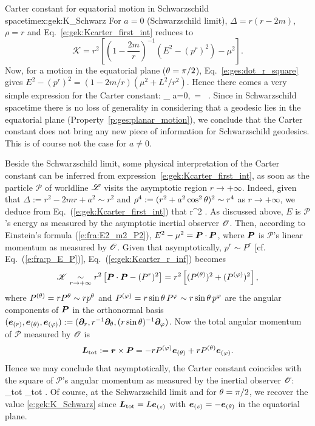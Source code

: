 \begin{texample}{Carter constant for equatorial motion in Schwarzschild spacetime}{x:gek:K_Schwarz}
For $a=0$ (Schwarzschild limit), $\Delta = r(r - 2m)$, $\rho = r$
and Eq.~\eqref{e:gek:Kcarter_first_int} reduces to
\[
    \mathscr{K} = r^2 \left[ \left( 1 - \frac{2m}{r} \right) ^{-1} \left( E^2 -  (p^r)^2 \right)
        - \mu^2 \right] .
\]
Now, for a motion in the equatorial plane ($\theta=\pi/2$), Eq.~\eqref{e:ges:dot_r_square} gives
$E^2 -  (p^r)^2 =  ( 1 - {2m}/{r} ) \left( \mu^2 + {L^2}/{r^2} \right)$.
Hence there comes a very simple expression for the Carter constant:
\be \label{e:gek:K_Schwarz}
    _{\; a=0,\, \th=} \ .
\ee
Since in Schwarzschild spacetime there is no loss of generality in considering that
a geodesic lies in the equatorial plane (Property~\ref{p:ges:planar_motion}), we conclude
that the Carter constant does not bring any new piece of information for
Schwarzschild geodesics. This is of course not the case for $a\neq 0$.
\end{texample}

Beside the Schwarzschild limit, some physical interpretation of the Carter constant
can be inferred from
expression~\eqref{e:gek:Kcarter_first_int}, as soon as the particle $\mathscr{P}$ of worldline $\mathscr{L}$ visits the asymptotic region $r\to+\infty$. Indeed, given
that $\Delta := r^2 - 2m r + a^2 \sim r^2$  and $\rho^4 := (r^2 + a^2\cos^2\theta)^2 \sim r^4$
as $r\to+\infty$, we deduce from Eq.~(\ref{e:gek:Kcarter_first_int})
that
\be \label{e:gek:Kcarter_r_inf}
      r^2 \left[ E^2 - \mu^2 - (p^r)^2 \right] .
\ee
As discussed above, $E$ is $\mathscr{P}$'s energy as measured by
the asymptotic inertial observer $\mathscr{O}$. Then, according to
Einstein's formula (\ref{e:fra:E2_m2_P2}), $E^2 - \mu^2 = \bm{P}\cdot\bm{P}$, where
$\bm{P}$ is $\mathscr{P}$'s linear momentum as measured by $\mathscr{O}$. Given
that asymptotically, $p^r\sim P^r$ [cf. Eq.~(\ref{e:fra:p_E_P})],
Eq.~(\ref{e:gek:Kcarter_r_inf}) becomes
\[
    \mathscr{K} \underset{r\to + \infty}{\sim} r^2 \left[ \bm{P}\cdot\bm{P} - (P^r)^2 \right]
    = r^2 \left[ (P^{(\theta)})^2 + (P^{(\varphi)})^2 \right],
\]
where $P^{(\theta)} = r P^\theta \sim r p^\theta$ and $P^{(\varphi)} = r\sin\theta\, P^\varphi \sim r\sin\theta\, p^\varphi$
are the angular components of $\bm{P}$ in the
orthonormal basis $(\bm{e}_{(r)}, \bm{e}_{(\theta)}, \bm{e}_{(\varphi)}) := (\bm{\partial}_r, r^{-1} \bm{\partial}_\theta,
(r\sin\theta)^{-1}\bm{\partial}_\varphi)$.
Now the total angular momentum of $\mathscr{P}$ measured by $\mathscr{O}$ is
\[
    \bm{L}_{\rm tot} := \bm{r} \times \bm{P} = - r P^{(\varphi)} \bm{e}_{(\theta)}
        + r P^{(\theta)} \bm{e}_{(\varphi)} .
\]
Hence we may conclude that asymptotically, the Carter constant coincides with
the square of $\mathscr{P}$'s angular momentum as measured by the inertial observer $\mathscr{O}$:
\be \label{e:gek:Kcarter_asymptot}
      _{\rm tot} \cdot {}_{\rm tot} .
\ee
Of course, at the Schwarzschild limit and for $\theta=\pi/2$,
we recover the value \eqref{e:gek:K_Schwarz} since
$\bm{L}_{\rm tot} = L \bm{e}_{(z)}$ with $\bm{e}_{(z)} = - \bm{e}_{(\theta)}$
in the equatorial plane.


